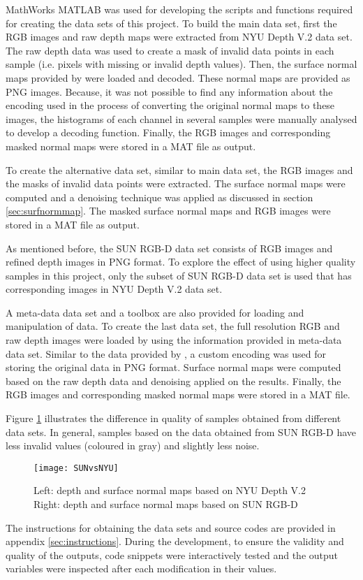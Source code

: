 \pagebreak

MathWorks MATLAB was used for developing the scripts and functions required for creating the data sets of this project. To build the main data set, first the RGB images and raw depth maps were extracted from NYU Depth V.2 data set. The raw depth data was used to create a mask of invalid data points in each sample (i.e. pixels with missing or invalid depth values). Then, the surface normal maps provided by \citeauthor*{ladicky} were loaded and decoded. These normal maps are provided as PNG images. Because, it was not possible to find any information about the encoding used in the process of converting the original normal maps to these images, the histograms of each channel in several samples were manually analysed to develop a decoding function. Finally, the RGB images and corresponding masked normal maps were stored in a MAT file as output.

To create the alternative data set, similar to main data set, the RGB images and the masks of invalid data points were extracted. The surface normal maps were computed and a denoising technique was applied as discussed in section \ref{sec:surfnormmap}. The masked surface normal maps and RGB images were stored in a MAT file as output.

As mentioned before, the SUN RGB-D data set consists of RGB images and refined depth images in PNG format. To explore the effect of using higher quality samples in this project, only the subset of SUN RGB-D data set is used that has corresponding images in NYU Depth V.2 data set. 

A meta-data data set and a toolbox are also provided for loading and manipulation of data. To create the last data set, the full resolution RGB and raw depth images were loaded by using the information provided in meta-data data set. Similar to the data provided by \citeauthor*{ladicky}, a custom encoding was used for storing the original data in PNG format. Surface normal maps were computed based on the raw depth data and denoising applied on the results. Finally, the RGB images and corresponding masked normal maps were stored in a MAT file.

Figure \ref{fig:sunvsnyu} illustrates the difference in quality of samples obtained from different data sets. In general, samples based on the data obtained from SUN RGB-D have less invalid values (coloured in gray) and slightly less noise. 

\begin{figure}
    \centering
    \texttt{[image: SUNvsNYU]}
    \caption{Left: depth and surface normal maps based on NYU Depth V.2 \\ Right: depth and surface normal maps based on SUN RGB-D}
    \label{fig:sunvsnyu}
\end{figure}

The instructions for obtaining the data sets and source codes are provided in appendix \ref{sec:instructions}. During the development, to ensure the validity and quality of the outputs, code snippets were interactively tested and the output variables were inspected after each modification in their values.




